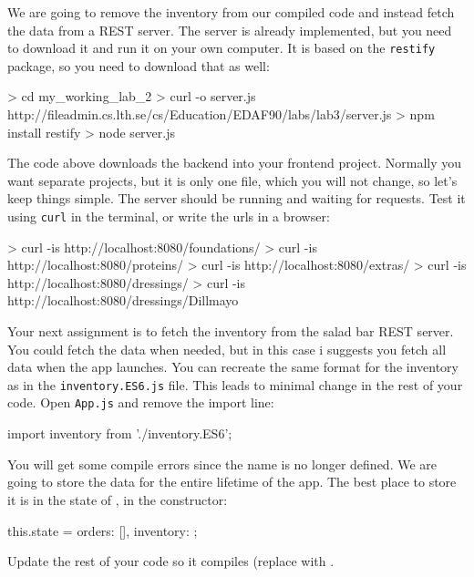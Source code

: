 \documentclass[fleqn, article, a4paper]{memoir}
\begin{document}
\begin{Assignments}

\item We are going to remove the inventory from our compiled code and instead fetch the data from a REST server. The server is already implemented, but you need to download it and run it on your own computer. It is based on the \texttt{restify} package, so you need to download that as well:
\begin{Code}
> cd my_working_lab_2
> curl -o server.js http://fileadmin.cs.lth.se/cs/Education/EDAF90/labs/lab3/server.js
> npm install restify
> node server.js
\end{Code}
The code above downloads the backend into your frontend project. Normally you want separate projects, but it is only one file, which you will not change, so let's keep things simple. The server should be running and waiting for requests. Test it using \texttt{curl} in the terminal, or write the urls in a browser:
\begin{Code}
> curl -is http://localhost:8080/foundations/
> curl -is http://localhost:8080/proteins/
> curl -is http://localhost:8080/extras/
> curl -is http://localhost:8080/dressings/
> curl -is http://localhost:8080/dressings/Dillmayo
\end{Code}

\item Your next assignment is to fetch the inventory from the salad bar REST server. You could fetch the data when needed, but in this case i suggests you fetch all data when the app launches. You can recreate the same format for the inventory as in the \texttt{inventory.ES6.js} file. This leads to minimal change in the rest of your code. Open \texttt{App.js} and remove the import line:
\begin{Code}
import inventory from './inventory.ES6';
\end{Code}
You will get some compile errors since the name  is no longer defined. We are going to store the data for the entire lifetime of the app. The best place to store it is in the state of , in the constructor:
\begin{Code}
this.state = {orders: [], inventory: {}};
\end{Code}
Update the rest of your code so it compiles (replace  with .


\end{Assignments}
\end{document}
